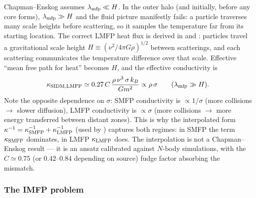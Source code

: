 \documentclass[12pt]{article}
\begin{document}
Chapman--Enskog assumes $\lambda_{\rm mfp}\ll H$.  In the outer halo
(and initially, before any core forms), $\lambda_{\rm mfp}\gg H$ and
the fluid picture manifestly fails: a particle traverses many scale
heights before scattering, so it samples the temperature far from its
starting location.  The correct LMFP heat flux is derived in
\citet{LyndenBell1980} and \citet{Balberg2002}: particles travel a
gravitational scale height
$H \equiv (\nu^2/4\pi G\rho)^{1/2}$ between scatterings, and each
scattering communicates the temperature difference over that scale.
Effective ``mean free path for heat'' becomes $H$, and the effective
conductivity is
%
\begin{equation}
  \kappa_{\rm SIDM,LMFP}
    \simeq 0.27\,C\,\frac{\rho\,\nu^3\,\sigma\,k_B}{Gm^2}
    \propto \rho\,\sigma
    \qquad (\lambda_{\rm mfp}\gg H).
  \label{eq:kappa_SIDM_LMFP}
\end{equation}
%
Note the opposite dependence on $\sigma$: SMFP conductivity is
$\propto 1/\sigma$ (more collisions $\to$ slower diffusion), LMFP
conductivity is $\propto\sigma$ (more collisions $\to$ more energy
transferred between distant zones).  This is why the interpolated
form
$\kappa^{-1} = \kappa_{\rm SMFP}^{-1} + \kappa_{\rm LMFP}^{-1}$
(used by \citealt{Balberg2002,Pollack2015,Meshveliani2023}) captures
both regimes: in SMFP the term $\kappa_{\rm SMFP}$ dominates, in LMFP
$\kappa_{\rm LMFP}$ does.  The interpolation is not a Chapman--Enskog
result --- it is an ansatz calibrated against $N$-body simulations,
with the $C\simeq 0.75$ (or $0.42$--$0.84$ depending on source)
fudge factor absorbing the mismatch.

\subsubsection{The IMFP problem}
\end{document}
